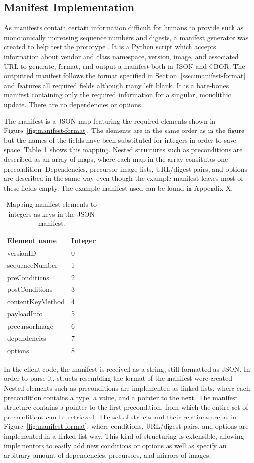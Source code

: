 \documentclass[0-thesis.tex]{subfiles}
\begin{document}
\subsection{Manifest Implementation}
\label{ssec:manifest-implementation}
As manifests contain certain information difficult for humans to provide such as
monotonically increasing sequence numbers and digests, a manifest generator was created to
help test the prototype \parencite{manifest-generator}. It is a Python script which
accepts information about vendor and class namespace, version, image, and associated URL
to generate, format, and output a manifest both in JSON and CBOR. The outputted manifest
follows the format specified in Section~\ref{ssec:manifest-format} and features all
required fields although many left blank. It is a bare-bones manifest containing only the
required information for a singular, monolithic update. There are no dependencies or
options. 

The manifest is a JSON map featuring the required elements shown in
Figure~\ref{fig:manifest-format}. The elements are in the same order as in the figure but
the names of the fields have been substituted for integers in order to save space.
Table~\ref{tab:manifest-substitution} shows this mapping. Nested structures such as
preconditions are described as an array of maps, where each map in the array consitutes
one precondition. Dependencies, precursor image lists, URL/digest pairs, and options are
described in the same way even though the example manifest leaves most of these fields
empty. The example manifest used can be found in Appendix X. 

\begin{longtable}[]{@{}ll@{}}
    \caption{Mapping manifest elements to integers as keys in the JSON manifest.}
    \label{tab:manifest-substitution}\\
    \toprule
    Element name & Integer\tabularnewline
    \midrule
    \endhead
    versionID & 0\tabularnewline
    sequenceNumber & 1\tabularnewline
    preConditions & 2\tabularnewline
    postConditions & 3\tabularnewline
    contentKeyMethod & 4\tabularnewline
    payloadInfo & 5\tabularnewline
    precursorImage & 6\tabularnewline
    dependencies & 7\tabularnewline
    options & 8\tabularnewline
    \bottomrule
\end{longtable}

In the client code, the manifest is received as a string, still formatted as JSON. In
order to parse it, structs resembling the format of the manifest were created. Nested
elements such as preconditions are implemented as linked lists, where each precondition
contains a type, a value, and a pointer to the next. The manifest structure contains a
pointer to the first precondition, from which the entire set of preconditions can be
retrieved. The set of structs and their relations are as in
Figure~\ref{fig:manifest-format}, where conditions, URL/digest pairs, and options are
implemented in a linked list way. This kind of structuring is extensible, allowing
implementors to easily add new conditions or options as well as specify an arbitrary
amount of dependencies, precursors, and mirrors of images.
    

\end{document}
